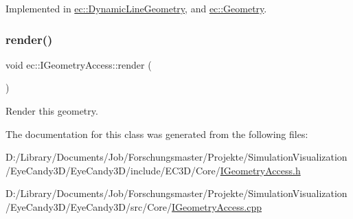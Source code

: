 Implemented in \mbox{\hyperlink{classec_1_1_dynamic_line_geometry_ab56984cee973ef2a73ff67339014f0cf}{ec\+::\+Dynamic\+Line\+Geometry}}, and \mbox{\hyperlink{classec_1_1_geometry_a1f166e70fc880e88092f29ef46afb836}{ec\+::\+Geometry}}.

\mbox{\label{classec_1_1_i_geometry_access_a9b6eaf56646bc2b5aa29385aaba02c7d}} 
\subsubsection{\texorpdfstring{render()}{render()}}
{\footnotesize\ttfamily void ec\+::\+I\+Geometry\+Access\+::render (\begin{DoxyParamCaption}{ }\end{DoxyParamCaption})\hspace{0.3cm}{\ttfamily [virtual]}}



Render this geometry. 



The documentation for this class was generated from the following files\+:\begin{DoxyCompactItemize}
\item 
D\+:/\+Library/\+Documents/\+Job/\+Forschungsmaster/\+Projekte/\+Simulation\+Visualization/\+Eye\+Candy3\+D/\+Eye\+Candy3\+D/include/\+E\+C3\+D/\+Core/\mbox{\hyperlink{_i_geometry_access_8h}{I\+Geometry\+Access.\+h}}\item 
D\+:/\+Library/\+Documents/\+Job/\+Forschungsmaster/\+Projekte/\+Simulation\+Visualization/\+Eye\+Candy3\+D/\+Eye\+Candy3\+D/src/\+Core/\mbox{\hyperlink{_i_geometry_access_8cpp}{I\+Geometry\+Access.\+cpp}}\end{DoxyCompactItemize}
